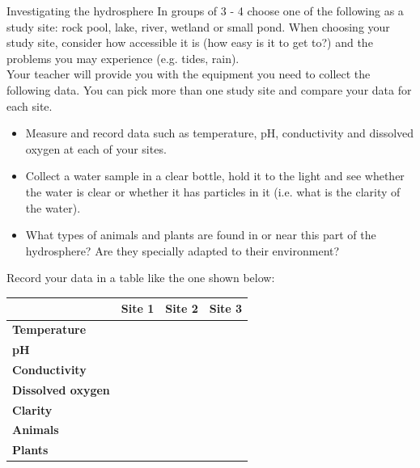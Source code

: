 \begin{Investigation}{Investigating the hydrosphere}
            \nopagebreak 
In groups of 3 - 4 choose one of the following as a study site: rock pool, lake, river, wetland or small pond. When choosing your study site, consider how accessible it is (how easy is it to get to?) and the problems you may experience (e.g.\@{} tides, rain).\\
Your teacher will provide you with the equipment you need to collect the following data. You can pick more than one study site and compare your data for each site.
\begin{itemize}
\item Measure and record data such as temperature, pH, conductivity and dissolved oxygen at each of your sites.
\item Collect a water sample in a clear bottle, hold it to the light and see whether the water is clear or whether it has particles in it (i.e.\@{} what is the clarity of the water). 
\item What types of animals and plants are found in or near this part of the hydrosphere? Are they specially adapted to their environment?
\end{itemize}

Record your data in a table like the one shown below:
          \begin{table}[H]
        \begin{center}
      \label{m38138*id334712}
    \noindent
      \begin{tabular}{|l|l|l|l|}\hline
         &
        \textbf{Site 1} &
        \textbf{Site 2} &
        \textbf{Site 3} \\ \hline
        \textbf{Temperature} &
         &
         &
       \\ \hline
        \textbf{pH} &
         &
         &
      \\ \hline
        \textbf{Conductivity} &
         &
         &
       \\ \hline
        \textbf{Dissolved oxygen} &
         &
         &
        \\ \hline
\textbf{Clarity } & & & \\ \hline
        \textbf{Animals} &
         &
         &
        \\ \hline
        \textbf{Plants} &
         &
         &
        \\ \hline
    \end{tabular}
      \end{center}
\end{table}


\end{Investigation}
